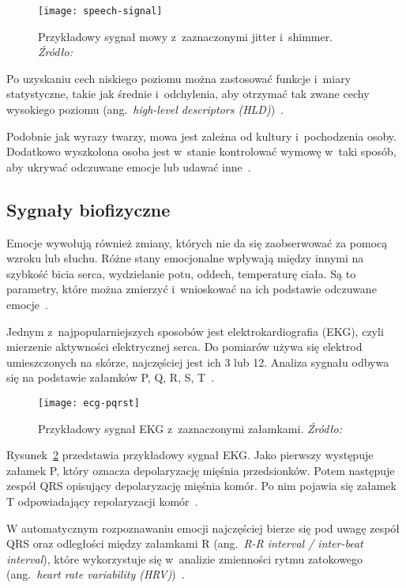 \begin{figure}[h]
    \centering
    \texttt{[image: speech-signal]}
    \caption{Przykładowy sygnał mowy z~zaznaczonymi jitter i~shimmer. \textit{Źródło:~\cite{Teixeira2013}}}
    \label{fig:speech-signal}
\end{figure}

Po uzyskaniu cech niskiego poziomu można zastosować funkcje i~miary statystyczne, takie jak średnie i~odchylenia, aby otrzymać tak zwane cechy wysokiego poziomu (ang.~\textit{high-level descriptors (HLD)})~\cite{Calvo2015}.

Podobnie jak wyrazy twarzy, mowa jest zależna od kultury i~pochodzenia osoby.
Dodatkowo wyszkolona osoba jest w~stanie kontrolować wymowę w~taki sposób, aby ukrywać odczuwane emocje lub udawać inne~\cite{Calvo2015}.

\subsection{Sygnały biofizyczne}\label{subsec:sygnaly-biofizyczne}

Emocje wywołują również zmiany, których nie da się zaobserwować za pomocą wzroku lub słuchu.
Różne stany emocjonalne wpływają między innymi na szybkość bicia serca, wydzielanie potu, oddech, temperaturę ciała.
Są to parametry, które można zmierzyć i~wnioskować na ich podstawie odczuwane emocje~\cite{Calvo2015}.

Jednym z~najpopularniejszych sposobów jest elektrokardiografia (EKG), czyli mierzenie aktywności elektrycznej serca.
Do pomiarów używa się elektrod umieszczonych na skórze, najczęściej jest ich 3 lub 12.
Analiza sygnału odbywa się na podstawie załamków P, Q, R, S, T~\cite{Calvo2015}.

\begin{figure}[h]
    \centering
    \texttt{[image: ecg-pqrst]}
    \caption{Przykładowy sygnał EKG z~zaznaczonymi załamkami. \textit{Źródło:~\cite{Dzedzickis2020}}}
    \label{fig:ecg-pqrst}
\end{figure}

Rysunek~\ref{fig:ecg-pqrst} przedstawia przykładowy sygnał EKG\@.
Jako pierwszy występuje załamek P, który oznacza depolaryzację mięśnia przedsionków.
Potem następuje zespół QRS opisujący depolaryzację mięśnia komór.
Po nim pojawia się załamek T odpowiadający repolaryzacji komór~\cite{Dzedzickis2020}.

W automatycznym rozpoznawaniu emocji najczęściej bierze się pod uwagę zespół QRS oraz odległości między załamkami R (ang.~\textit{R-R interval / inter-beat interval}), które wykorzystuje się w~analizie zmienności rytmu zatokowego (ang.~\textit{heart rate variability (HRV)})~\cite{Calvo2015}.

